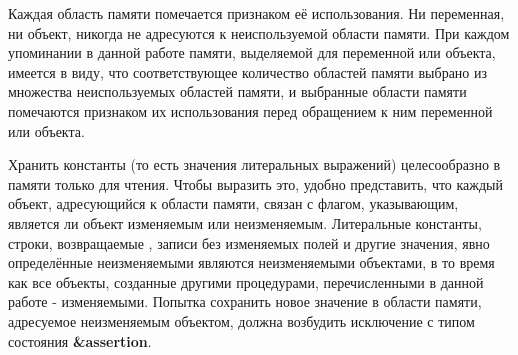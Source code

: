Каждая область памяти помечается признаком её использования. Ни переменная, ни объект, никогда
не адресуются к неиспользуемой области памяти. При каждом упоминании в данной работе памяти,
выделяемой для переменной или объекта, имеется в виду, что соответствующее количество областей
памяти выбрано из множества неиспользуемых областей памяти, и выбранные области памяти
помечаются признаком их использования перед обращением к ним переменной или объекта.

Хранить константы (то есть значения литеральных выражений) целесообразно в
памяти только для чтения. Чтобы выразить это, удобно представить, что каждый объект,
адресующийся к области памяти, связан с флагом, указывающим, является ли объект
изменяемым или неизменяемым. Литеральные константы, строки,
возвращаемые {\bfseries{}}, записи без изменяемых полей и другие значения,
явно определённые неизменяемыми являются неизменяемыми объектами, в то время как все объекты,
созданные другими процедурами, перечисленными в данной работе - изменяемыми. Попытка сохранить
новое значение в области памяти, адресуемое неизменяемым объектом, должна возбудить исключение с
типом состояния {\bfseries\cf\&assertion}.

